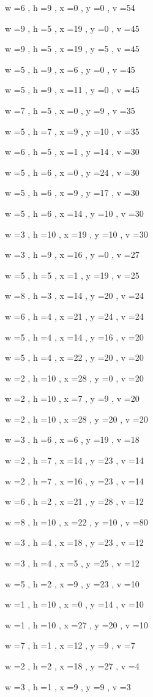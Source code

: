 \documentclass[11pt]{article}
\begin{document}
w =6 , h =9 , x =0 , y =0 , v =54
\par
w =9 , h =5 , x =19 , y =0 , v =45
\par
w =9 , h =5 , x =19 , y =5 , v =45
\par
w =5 , h =9 , x =6 , y =0 , v =45
\par
w =5 , h =9 , x =11 , y =0 , v =45
\par
w =7 , h =5 , x =0 , y =9 , v =35
\par
w =5 , h =7 , x =9 , y =10 , v =35
\par
w =6 , h =5 , x =1 , y =14 , v =30
\par
w =5 , h =6 , x =0 , y =24 , v =30
\par
w =5 , h =6 , x =9 , y =17 , v =30
\par
w =5 , h =6 , x =14 , y =10 , v =30
\par
w =3 , h =10 , x =19 , y =10 , v =30
\par
w =3 , h =9 , x =16 , y =0 , v =27
\par
w =5 , h =5 , x =1 , y =19 , v =25
\par
w =8 , h =3 , x =14 , y =20 , v =24
\par
w =6 , h =4 , x =21 , y =24 , v =24
\par
w =5 , h =4 , x =14 , y =16 , v =20
\par
w =5 , h =4 , x =22 , y =20 , v =20
\par
w =2 , h =10 , x =28 , y =0 , v =20
\par
w =2 , h =10 , x =7 , y =9 , v =20
\par
w =2 , h =10 , x =28 , y =20 , v =20
\par
w =3 , h =6 , x =6 , y =19 , v =18
\par
w =2 , h =7 , x =14 , y =23 , v =14
\par
w =2 , h =7 , x =16 , y =23 , v =14
\par
w =6 , h =2 , x =21 , y =28 , v =12
\par
w =8 , h =10 , x =22 , y =10 , v =80
\par
w =3 , h =4 , x =18 , y =23 , v =12
\par
w =3 , h =4 , x =5 , y =25 , v =12
\par
w =5 , h =2 , x =9 , y =23 , v =10
\par
w =1 , h =10 , x =0 , y =14 , v =10
\par
w =1 , h =10 , x =27 , y =20 , v =10
\par
w =7 , h =1 , x =12 , y =9 , v =7
\par
w =2 , h =2 , x =18 , y =27 , v =4
\par
w =3 , h =1 , x =9 , y =9 , v =3
\par
\newpage
\end{document}
